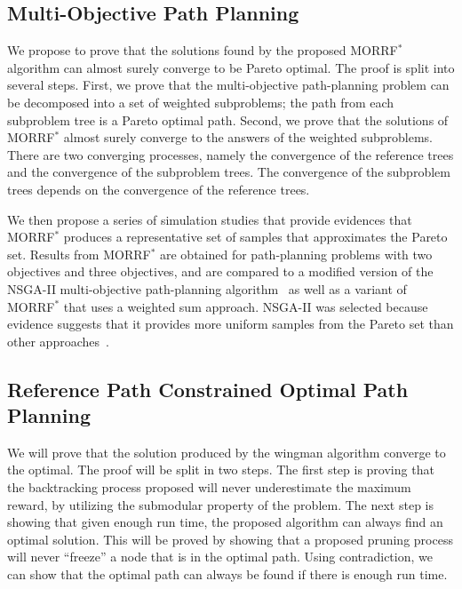 \documentclass[phd]{byuprop}
\begin{document}
\subsection{Multi-Objective Path Planning}
\label{sec:validation:multi_objective_path_planning}

We propose to prove that the solutions found by the proposed MORRF$^{*}$ algorithm can almost surely converge to be Pareto optimal.
The proof is split into several steps.
First, we prove that the multi-objective path-planning problem can be decomposed into a set of weighted subproblems;
the path from each subproblem tree is a Pareto optimal path.
Second, we prove that the solutions of MORRF$^{*}$ almost surely converge to the answers of the weighted subproblems.
There are two converging processes, namely the convergence of the reference trees and the convergence of the subproblem trees.
The convergence of the subproblem trees depends on the convergence of the reference trees.

We then propose a series of simulation studies that provide evidences that MORRF$^{*}$ produces a representative set of samples that approximates the Pareto set.
Results from MORRF$^{*}$ are obtained for path-planning problems with two objectives and three objectives, and are compared to a modified version of the NSGA-II multi-objective path-planning algorithm~\cite{Ahmed2013} as well as a variant of MORRF$^{*}$ that uses a weighted sum approach.
NSGA-II was selected because evidence suggests that it provides more uniform samples from the Pareto set than other approaches~\cite{Deb2002}.

\subsection{Reference Path Constrained Optimal Path Planning}
\label{sec:validation:reference_path_constrained_optimal_path_planning}

We will prove that the solution produced by the wingman algorithm converge to the optimal.
The proof will be split in two steps.
The first step is proving that the backtracking process proposed will never underestimate the maximum reward, by utilizing the submodular property of the problem.
The next step is showing that given enough run time, the proposed algorithm can always find an optimal solution.
This will be proved by showing that a proposed pruning process will never ``freeze'' a node that is in the optimal path.
Using contradiction, we can show that the optimal path can always be found if there is enough run time.
\end{document}
